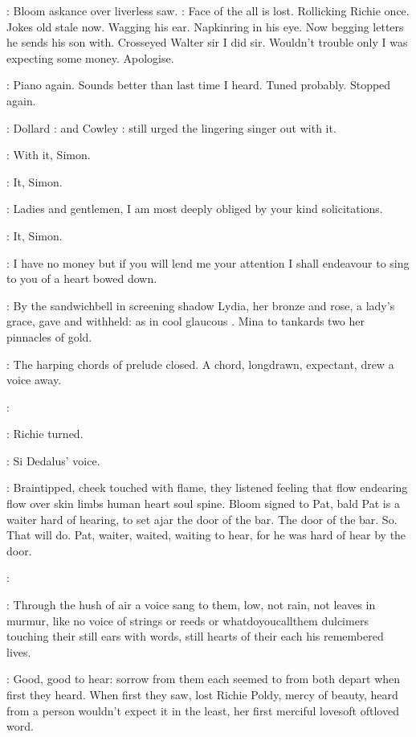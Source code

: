 :
Bloom askance over liverless saw.
\BloomInt:
Face of the all is lost.
Rollicking
Richie once.
Jokes old stale now.
Wagging his ear.
Napkinring in his eye.
Now begging letters he sends his son with.
Crosseyed Walter sir I did sir.
Wouldn't trouble only I was expecting some money.
Apologise.

\BloomInt:
Piano again.
Sounds better than last time I heard.
Tuned probably.
Stopped again.

:
Dollard
:
and Cowley
:
still urged the lingering singer out with it.

\dollard:
With it,
Simon.

\cowley:
It,
Simon.

\simon:
Ladies and gentlemen,
I am most deeply obliged by your kind
solicitations.

\cowley:
It,
Simon.

\simon:
I have no money but if you will lend me your attention I shall endeavour
to sing to you of a heart bowed down.

:
By the sandwichbell
in screening shadow Lydia,
her bronze and rose,
a lady's grace,
gave and withheld:
as in cool glaucous
.
Mina to tankards two her pinnacles of gold.

:
The harping chords of prelude closed.
A chord,
longdrawn,
expectant,
drew a voice away.

\simon:

:
Richie turned.

\goulding:
Si Dedalus' voice.

:
Braintipped,
cheek touched with flame,
they listened feeling that flow
endearing flow over skin limbs human heart soul spine.
Bloom signed to
Pat,
bald Pat is a waiter hard of hearing,
to set ajar the door of the
bar.
The door of the bar.
So.
That will do.
Pat,
waiter,
waited,
waiting
to hear,
for he was hard of hear by the door.

\simon:

:
Through the hush of air a voice sang to them,
low,
not rain,
not leaves
in murmur,
like no voice of strings or reeds or whatdoyoucallthem
dulcimers touching their still ears with words,
still hearts of their each
his remembered lives.

\BloomInt:
Good,
good to hear:
sorrow from them each seemed to
from both depart when first they heard.
When first they saw,
lost Richie
Poldy,
mercy of beauty,
heard from a person wouldn't expect it in the least,
her first merciful
lovesoft oftloved word.

